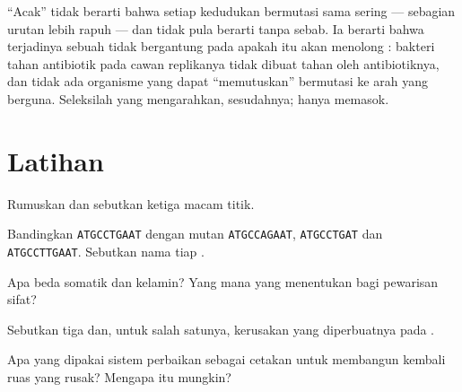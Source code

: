 \begin{remark}\label{rem:g11:mutations:random}
``Acak'' tidak berarti bahwa setiap kedudukan bermutasi sama sering ---
sebagian urutan lebih rapuh --- dan tidak pula berarti  tanpa
sebab. Ia berarti bahwa terjadinya sebuah  tidak bergantung pada
apakah  itu akan menolong : bakteri tahan antibiotik pada
cawan replikanya tidak dibuat tahan oleh antibiotiknya, dan tidak ada
organisme yang dapat ``memutuskan'' bermutasi ke arah yang berguna.
Seleksilah yang mengarahkan, sesudahnya;  hanya memasok.
\end{remark}

\section{Latihan}

\begin{exercise}[$\star$]\label{exo:g11:mutations:1}
Rumuskan  dan sebutkan ketiga macam  titik.
\end{exercise}

\begin{exercise}[$\star$]\label{exo:g11:mutations:2}
Bandingkan \texttt{ATGCCTGAAT} dengan mutan \texttt{ATGCCAGAAT},
\texttt{ATGCCTGAT} dan \texttt{ATGCCTTGAAT}. Sebutkan nama tiap .
\end{exercise}

\begin{exercise}[$\star$]\label{exo:g11:mutations:3}
Apa beda  somatik dan   kelamin? Yang mana yang
menentukan bagi pewarisan sifat?
\end{exercise}

\begin{exercise}[$\star$]\label{exo:g11:mutations:4}
Sebutkan tiga  dan, untuk salah satunya, kerusakan yang
diperbuatnya pada .
\end{exercise}

\begin{exercise}[$\star$]\label{exo:g11:mutations:5}
Apa yang dipakai sistem perbaikan sebagai cetakan untuk membangun
kembali ruas yang rusak? Mengapa itu mungkin?
\end{exercise}

